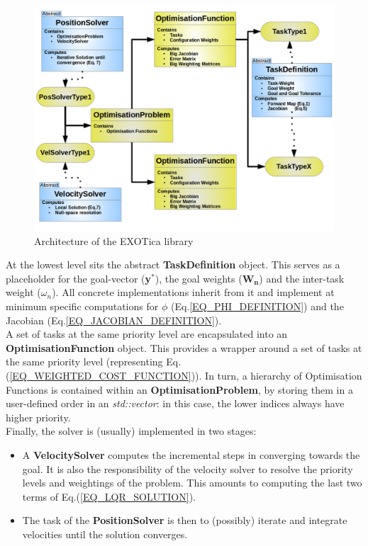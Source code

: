 \documentclass[12pt,a4paper,onecolumn]{article}
\begin{document}
\begin{figure}[!htp]
	\centering
    \includegraphics[width=\textwidth]{Exotica_Architecture.png}
    \caption{Architecture of the EXOTica library}
   	\label{FIG_EXOTICA_ARCHITECTURE}
\end{figure}


\noindent At the lowest level sits the abstract \textbf{TaskDefinition} object. This serves as a placeholder for the goal-vector (\textbf{y}$^*$), the goal weights ($\mathbf{W_n}$) and the inter-task weight ($\omega_n$). All concrete implementations inherit from it and implement at minimum specific computations for $\phi$ (Eq.\ref{EQ_PHI_DEFINITION}) and the Jacobian (Eq.\ref{EQ_JACOBIAN_DEFINITION}).\\
\newline
\noindent A set of tasks at the same priority level are encapsulated into an \textbf{OptimisationFunction} object. This provides a wrapper around a set of tasks at the same priority level (representing Eq.(\ref{EQ_WEIGHTED_COST_FUNCTION})). In turn, a hierarchy of Optimisation Functions is contained within an \textbf{OptimisationProblem}, by storing them in a user-defined order in an \textsl{std::vector}: in this case, the lower indices always have higher priority.\\
\newline
\noindent Finally, the solver is (usually) implemented in two stages:
\begin{itemize}
\item A \textbf{VelocitySolver} computes the incremental steps in converging towards the goal. It is also the responsibility of the velocity solver to resolve the priority levels and weightings of the problem. This amounts to computing the last two terms of Eq.(\ref{EQ_LQR_SOLUTION}).
\item The task of the \textbf{PositionSolver} is then to (possibly) iterate and integrate velocities until the solution converges.
\end{itemize}
\end{document}
